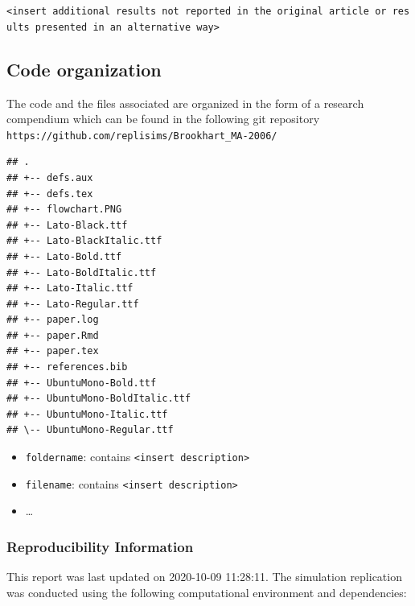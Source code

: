 \documentclass[10,a4paperpaper,]{article}
\begin{document}
\texttt{\textless{}insert\ additional\ results\ not\ reported\ in\ the\ original\ article\ or\ results\ presented\ in\ an\ alternative\ way\textgreater{}}

\subsection{Code organization}

The code and the files associated are organized in the form of a
research compendium which can be found in the following git repository
\texttt{https://github.com/replisims/Brookhart\_MA-2006/}

\begin{verbatim}
## .
## +-- defs.aux
## +-- defs.tex
## +-- flowchart.PNG
## +-- Lato-Black.ttf
## +-- Lato-BlackItalic.ttf
## +-- Lato-Bold.ttf
## +-- Lato-BoldItalic.ttf
## +-- Lato-Italic.ttf
## +-- Lato-Regular.ttf
## +-- paper.log
## +-- paper.Rmd
## +-- paper.tex
## +-- references.bib
## +-- UbuntuMono-Bold.ttf
## +-- UbuntuMono-BoldItalic.ttf
## +-- UbuntuMono-Italic.ttf
## \-- UbuntuMono-Regular.ttf
\end{verbatim}

\begin{itemize}
\tightlist
\item
  \texttt{foldername}: contains
  \texttt{\textless{}insert\ description\textgreater{}}
\item
  \texttt{filename}: contains
  \texttt{\textless{}insert\ description\textgreater{}}
\item
  \ldots{}
\end{itemize}

\subsubsection*{Reproducibility Information}

This report was last updated on 2020-10-09 11:28:11. The simulation
replication was conducted using the following computational environment
and dependencies:

\FloatBarrier
\end{document}
